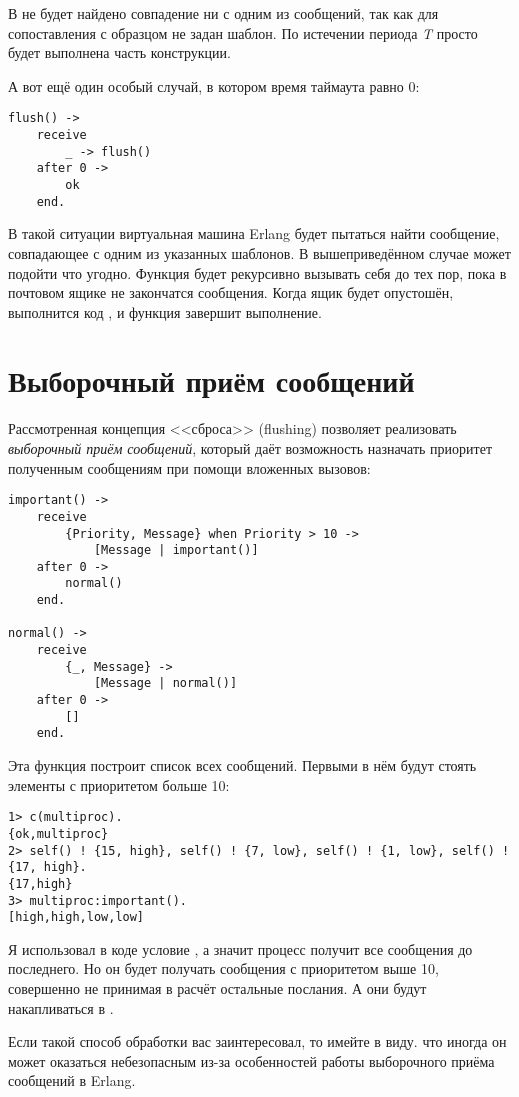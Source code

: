 В  не будет найдено совпадение ни с одним из сообщений, так как для сопоставления с образцом не задан шаблон.
По истечении периода \emph{T} просто будет выполнена  часть конструкции.

А вот ещё один особый случай, в котором время таймаута равно 0:
\begin{lstlisting}[style=erlang]
flush() ->
    receive
        _ -> flush()
    after 0 ->
        ok
    end.
\end{lstlisting}

В такой ситуации виртуальная машина Erlang будет пытаться найти сообщение, совпадающее с одним из указанных шаблонов.
В вышеприведённом случае может подойти что угодно.
Функция  будет рекурсивно вызывать себя до тех пор, пока в почтовом ящике не закончатся сообщения.
Когда ящик будет опустошён, выполнится код , и функция завершит выполнение.
\section{Выборочный приём сообщений}
\label{selective-receives}
Рассмотренная  концепция <<сброса>> (flushing) позволяет реализовать \emph{выборочный приём сообщений}, который даёт возможность назначать приоритет полученным сообщениям при помощи вложенных вызовов:
\begin{lstlisting}[style=erlang]
important() ->
    receive
        {Priority, Message} when Priority > 10 ->
            [Message | important()]
    after 0 ->
        normal()
    end.
 
normal() ->
    receive
        {_, Message} ->
            [Message | normal()]
    after 0 ->
        []
    end.
\end{lstlisting}

Эта функция построит список всех сообщений.
Первыми в нём будут стоять элементы с приоритетом больше 10:
\begin{lstlisting}[style=erlang]
1> c(multiproc).
{ok,multiproc}
2> self() ! {15, high}, self() ! {7, low}, self() ! {1, low}, self() ! {17, high}.      
{17,high}
3> multiproc:important().
[high,high,low,low]
\end{lstlisting}

Я использовал в коде условие , а значит процесс получит все сообщения до последнего.
Но он будет получать сообщения с приоритетом выше 10, совершенно не принимая в расчёт остальные послания.
А они будут накапливаться в .

Если такой способ обработки вас заинтересовал, то имейте в виду. что иногда он может оказаться небезопасным из\--за особенностей работы выборочного приёма сообщений в Erlang.


